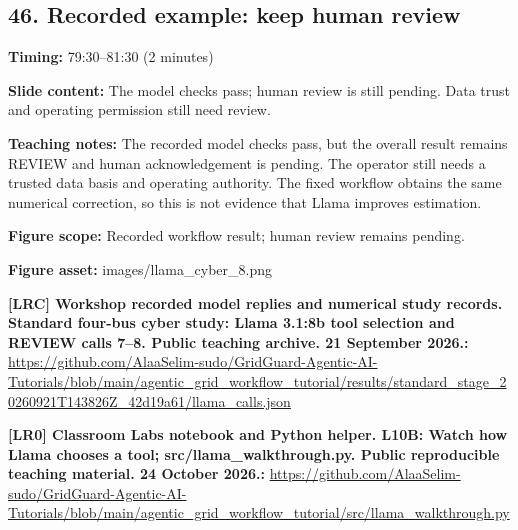 \documentclass[10pt,letterpaper]{article}
\begin{document}
\subsection*{46. Recorded example: keep human review}
\textbf{Timing:} 79:30--81:30 (2 minutes)\par
\textbf{Slide content:} The model checks pass; human review is still pending.
Data trust and operating permission still need review.\par
\textbf{Teaching notes:} The recorded model checks pass, but the overall result remains REVIEW and human acknowledgement is pending. The operator still needs a trusted data basis and operating authority. The fixed workflow obtains the same numerical correction, so this is not evidence that Llama improves estimation.\par
\textbf{Figure scope:} Recorded workflow result; human review remains pending.\par
\textbf{Figure asset:} images/llama\_cyber\_8.png\par
\textbf{[LRC] Workshop recorded model replies and numerical study records. Standard four-bus cyber study: Llama 3.1:8b tool selection and REVIEW calls 7--8. Public teaching archive. 21 September 2026.:} \href{https://github.com/AlaaSelim-sudo/GridGuard-Agentic-AI-Tutorials/blob/main/agentic_grid_workflow_tutorial/results/standard_stage_20260921T143826Z_42d19a61/llama_calls.json}{\small\ttfamily https:/\allowbreak{}/\allowbreak{}github.\allowbreak{}com/\allowbreak{}AlaaSelim-\allowbreak{}sudo/\allowbreak{}GridGuard-\allowbreak{}Agentic-\allowbreak{}AI-\allowbreak{}Tutorials/\allowbreak{}blob/\allowbreak{}main/\allowbreak{}agentic\_\allowbreak{}grid\_\allowbreak{}workflow\_\allowbreak{}tutorial/\allowbreak{}results/\allowbreak{}standard\_\allowbreak{}stage\_\allowbreak{}20260921T143826Z\_\allowbreak{}42d19a61/\allowbreak{}llama\_\allowbreak{}calls.\allowbreak{}json}\par
\textbf{[LR0] Classroom Labs notebook and Python helper. L10B: Watch how Llama chooses a tool; src/llama\_walkthrough.py. Public reproducible teaching material. 24 October 2026.:} \href{https://github.com/AlaaSelim-sudo/GridGuard-Agentic-AI-Tutorials/blob/main/agentic_grid_workflow_tutorial/src/llama_walkthrough.py}{\small\ttfamily https:/\allowbreak{}/\allowbreak{}github.\allowbreak{}com/\allowbreak{}AlaaSelim-\allowbreak{}sudo/\allowbreak{}GridGuard-\allowbreak{}Agentic-\allowbreak{}AI-\allowbreak{}Tutorials/\allowbreak{}blob/\allowbreak{}main/\allowbreak{}agentic\_\allowbreak{}grid\_\allowbreak{}workflow\_\allowbreak{}tutorial/\allowbreak{}src/\allowbreak{}llama\_\allowbreak{}walkthrough.\allowbreak{}py}\par
\par\medskip
\end{document}
